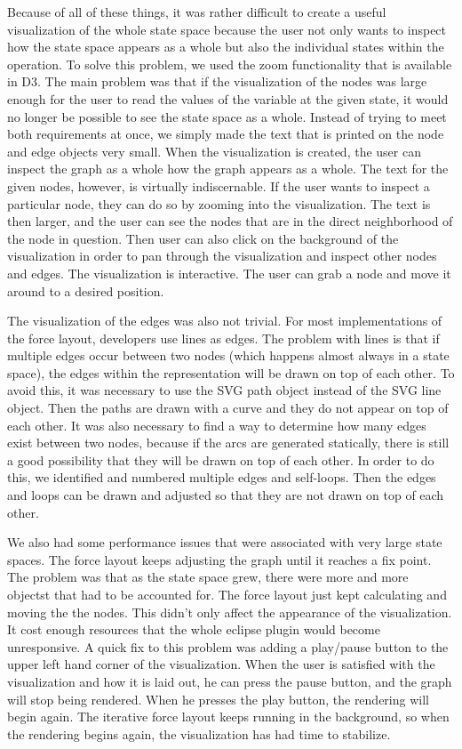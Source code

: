 Because of all of these things, it was rather difficult to create a useful visualization of the whole state space because the user not only wants to inspect how the state space appears as a whole but also the individual states within the operation. To solve this problem, we used the zoom functionality that is available in D3. The main problem was that if the visualization of the nodes was large enough for the user to read the values of the variable at the given state, it would no longer be possible to see the state space as a whole. Instead of trying to meet both requirements at once, we simply made the text that is printed on the node and edge objects very small. When the visualization is created, the user can inspect the graph as a whole how the graph appears as a whole. The text for the given nodes, however, is virtually indiscernable. If the user wants to inspect a particular node, they can do so by zooming into the visualization. The text is then larger, and the user can see the nodes that are in the direct neighborhood of the node in question. Then user can also click on the background of the visualization in order to pan through the visualization and inspect other nodes and edges. The visualization is interactive. The user can grab a node and move it around to a desired position.

The visualization of the edges was also not trivial. For most implementations of the force layout, developers use lines as edges. The problem with lines is that if multiple edges occur between two nodes (which happens almost always in a state space), the edges within the representation will be drawn on top of each other. To avoid this, it was necessary to use the SVG path object instead of the SVG line object. Then the paths are drawn with a curve and they do not appear on top of each other. It was also necessary to find a way to determine how many edges exist between two nodes, because if the arcs are generated statically, there is still a good possibility that they will be drawn on top of each other. In order to do this, we identified and numbered multiple edges and self-loops. Then the edges and loops can be drawn and adjusted so that they are not drawn on top of each other.

We also had some performance issues that were associated with very large state spaces. The force layout keeps adjusting the graph until it reaches a fix point. The problem was that as the state space grew, there were more and more objectst that had to be accounted for. The force layout just kept calculating and moving the the nodes. This didn't only affect the appearance of the visualization. It cost enough resources that the whole eclipse plugin would become unresponsive. A quick fix to this problem was adding a play/pause button to the upper left hand corner of the visualization. When the user is satisfied with the visualization and how it is laid out, he can press the pause button, and the graph will stop being rendered. When he presses the play button, the rendering will begin again. The iterative force layout keeps running in the background, so when the rendering begins again, the visualization has had time to stabilize.

